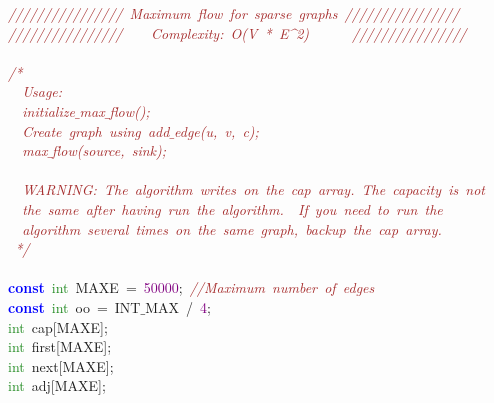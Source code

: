 {\ttfamily \raggedright {
\noindent
\mbox{}\textit{\textcolor{Brown}{////////////////\ Maximum\ flow\ for\ sparse\ graphs\ ////////////////}} \\
\mbox{}\textit{\textcolor{Brown}{////////////////\ \ \ \ Complexity:\ O(V\ *\ E\textasciicircum{}2)\ \ \ \ \ \ ////////////////}} \\
\mbox{} \\
\mbox{}\textit{\textcolor{Brown}{/*}} \\
\mbox{}\textit{\textcolor{Brown}{\ \ Usage:}} \\
\mbox{}\textit{\textcolor{Brown}{\ \ initialize$\_$max$\_$flow();}} \\
\mbox{}\textit{\textcolor{Brown}{\ \ Create\ graph\ using\ add$\_$edge(u,\ v,\ c);}} \\
\mbox{}\textit{\textcolor{Brown}{\ \ max$\_$flow(source,\ sink);}} \\
\mbox{} \\
\mbox{}\textit{\textcolor{Brown}{\ \ WARNING:\ The\ algorithm\ writes\ on\ the\ cap\ array.\ The\ capacity\ is\ not}} \\
\mbox{}\textit{\textcolor{Brown}{\ \ the\ same\ after\ having\ run\ the\ algorithm.\ \ If\ you\ need\ to\ run\ the}} \\
\mbox{}\textit{\textcolor{Brown}{\ \ algorithm\ several\ times\ on\ the\ same\ graph,\ backup\ the\ cap\ array.}} \\
\mbox{}\textit{\textcolor{Brown}{\ */}} \\
\mbox{} \\
\mbox{}\textbf{\textcolor{Blue}{const}}\ \textcolor{ForestGreen}{int}\ MAXE\ \textcolor{BrickRed}{=}\ \textcolor{Purple}{50000}\textcolor{BrickRed}{;}\ \textit{\textcolor{Brown}{//Maximum\ number\ of\ edges}} \\
\mbox{}\textbf{\textcolor{Blue}{const}}\ \textcolor{ForestGreen}{int}\ oo\ \textcolor{BrickRed}{=}\ INT$\_$MAX\ \textcolor{BrickRed}{/}\ \textcolor{Purple}{4}\textcolor{BrickRed}{;} \\
\mbox{}\textcolor{ForestGreen}{int}\ cap\textcolor{BrickRed}{[}MAXE\textcolor{BrickRed}{];} \\
\mbox{}\textcolor{ForestGreen}{int}\ first\textcolor{BrickRed}{[}MAXE\textcolor{BrickRed}{];} \\
\mbox{}\textcolor{ForestGreen}{int}\ next\textcolor{BrickRed}{[}MAXE\textcolor{BrickRed}{];} \\
\mbox{}\textcolor{ForestGreen}{int}\ adj\textcolor{BrickRed}{[}MAXE\textcolor{BrickRed}{];} \\
}}
